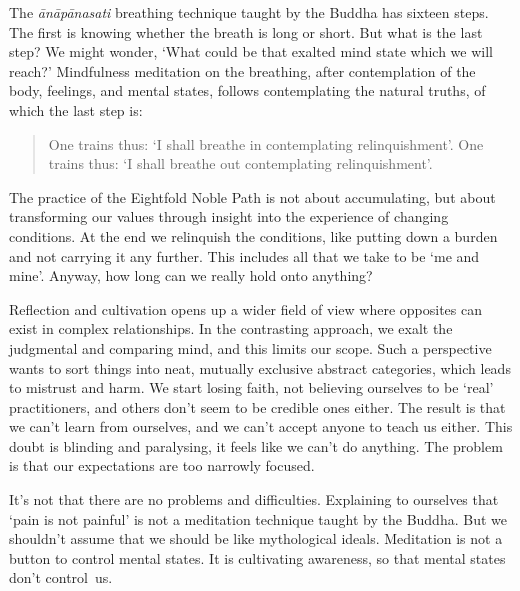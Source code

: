 \enlargethispage*{\baselineskip}

The \emph{ānāpānasati} breathing technique taught by the Buddha has
sixteen steps. The first is knowing whether the breath is long or short.
But what is the last step? We might wonder, `What could be that exalted
mind state which we will reach?' Mindfulness meditation on the
breathing, after contemplation of the body, feelings, and mental states,
follows contemplating the natural truths, of which the last step is:

\begin{quote}
One trains thus: `I shall breathe in contemplating relinquishment'. One
trains thus: `I shall breathe out contemplating relinquishment'.

\bigskip

\end{quote}

The practice of the Eightfold Noble Path is not about accumulating, but
about transforming our values through insight into the experience of
changing conditions. At the end we relinquish the conditions, like
putting down a burden and not carrying it any further. This includes all
that we take to be `me and mine'. Anyway, how long can we really hold
onto anything?


Reflection and cultivation opens up a wider field of view where
opposites can exist in complex relationships. In the contrasting
approach, we exalt the judgmental and comparing mind, and this limits
our scope. Such a perspective wants to sort things into neat, mutually
exclusive abstract categories, which leads to mistrust and harm. We
start losing faith, not believing ourselves to be `real' practitioners,
and others don't seem to be credible ones either. The result is that we
can't learn from ourselves, and we can't accept anyone to teach us
either. This doubt is blinding and paralysing, it feels like we can't do
anything. The problem is that our expectations are too narrowly focused.

\enlargethispage*{\baselineskip}

It's not that there are no problems and difficulties. Explaining to
ourselves that `pain is not painful' is not a meditation technique
taught by the Buddha. But we shouldn't assume that we should be like
mythological ideals. Meditation is not a button to control mental
states. It is cultivating awareness, so that mental states don't control~us.

